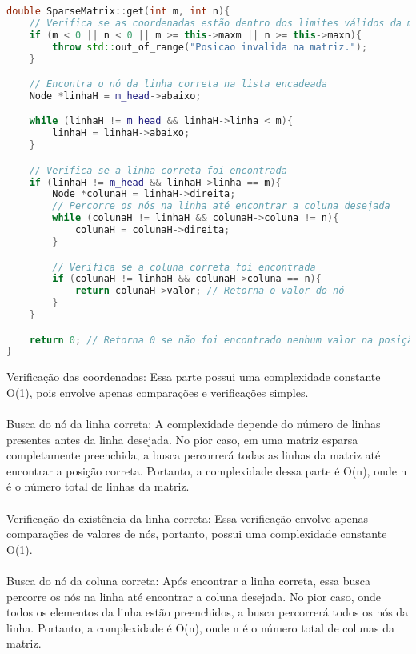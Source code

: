 \documentclass[a4paper,12pt]{article}
\begin{document}
\begin{lstlisting}[language=C++]
double SparseMatrix::get(int m, int n){
    // Verifica se as coordenadas estão dentro dos limites válidos da matriz
    if (m < 0 || n < 0 || m >= this->maxm || n >= this->maxn){
        throw std::out_of_range("Posicao invalida na matriz.");
    }

    // Encontra o nó da linha correta na lista encadeada
    Node *linhaH = m_head->abaixo;

    while (linhaH != m_head && linhaH->linha < m){
        linhaH = linhaH->abaixo;
    }

    // Verifica se a linha correta foi encontrada
    if (linhaH != m_head && linhaH->linha == m){
        Node *colunaH = linhaH->direita;
        // Percorre os nós na linha até encontrar a coluna desejada
        while (colunaH != linhaH && colunaH->coluna != n){
            colunaH = colunaH->direita;
        }

        // Verifica se a coluna correta foi encontrada
        if (colunaH != linhaH && colunaH->coluna == n){
            return colunaH->valor; // Retorna o valor do nó
        }
    }

    return 0; // Retorna 0 se não foi encontrado nenhum valor na posição especificada
}
\end{lstlisting}
Verificação das coordenadas: Essa parte possui uma complexidade constante O(1), pois envolve apenas comparações e verificações simples.
\\\\
Busca do nó da linha correta: A complexidade depende do número de linhas presentes antes da linha desejada. No pior caso, em uma matriz esparsa completamente preenchida, a busca percorrerá todas as linhas da matriz até encontrar a posição correta. Portanto, a complexidade dessa parte é O(n), onde n é o número total de linhas da matriz.
\\\\
Verificação da existência da linha correta: Essa verificação envolve apenas comparações de valores de nós, portanto, possui uma complexidade constante O(1).
\\\\
Busca do nó da coluna correta: Após encontrar a linha correta, essa busca percorre os nós na linha até encontrar a coluna desejada. No pior caso, onde todos os elementos da linha estão preenchidos, a busca percorrerá todos os nós da linha. Portanto, a complexidade é O(n), onde n é o número total de colunas da matriz.
\\\\
\end{document}
